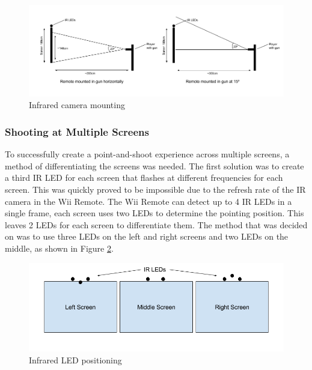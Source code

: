 \documentclass[a4paper,11pt]{article}
\begin{document}
\begin{figure}
	\centering
	\includegraphics[scale=0.4]{ir}
    \caption{Infrared camera mounting}
    \label{fig:ir_mounting}
\end{figure}

\subsubsection{Shooting at Multiple Screens}
To successfully create a point-and-shoot experience across multiple screens, a method of differentiating the screens was needed. The first solution was to create a third IR LED for each screen that flashes at different frequencies for each screen. This was quickly proved to be impossible due to the refresh rate of the IR camera in the Wii Remote. The Wii Remote can detect up to 4 IR LEDs in a single frame, each screen uses two LEDs to determine the pointing position. This leaves 2 LEDs for each screen to differentiate them. The method that was decided on was to use three LEDs on the left and right screens and two LEDs on the middle, as shown in Figure \ref{fig:led_pos}. 

\begin{figure}
	\centering
	\includegraphics[scale=0.4]{led_pos}
    \caption{Infrared LED positioning}
    \label{fig:led_pos}
\end{figure}
\end{document}
